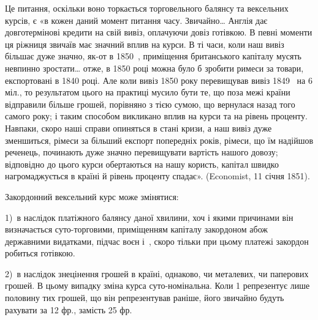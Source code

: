 Це питання, оскільки воно торкається торговельного балянсу та вексельних
курсів, є «в кожен даний момент питання часу. Звичайно\dots{} Англія дає
довготермінові кредити на свій вивіз, оплачуючи довіз готівкою. В певні моменти
ця ріжниця звичаїв має значний вплив на курси. В ті часи, коли наш
вивіз більшає дуже значно, як-от в 1850~, приміщення британського капіталу
мусять невпинно зростати\dots{} отже, в 1850 році можна було б зробити римеси
за товари, експортовані в 1840 році. Але коли вивіз 1850 року перевищував
вивіз 1849~ на 6 міл., то результатом цього на практиці мусило бути те, що
поза межі країни відправили більше грошей, порівняно з тією сумою, що вернулася
назад того самого року; і таким способом викликано вплив на курси
та на рівень проценту. Навпаки, скоро наші справи опиняться в стані кризи,
а наш вивіз дуже зменшиться, рімеси за більший експорт попередніх років, рімеси,
що їм надійшов реченець, починають дуже значно перевищувати вартість нашого
довозу; відповідно до цього курси обертаються на нашу користь, капітал швидко
нагромаджується в країні й рівень проценту спадає». (Economist, 11 січня 1851).

Закордонний вексельний курс може змінятися:

1)~в наслідок платіжного балянсу даної хвилини, хоч і якими причинами він
визначається суто-торговими, приміщенням капіталу закордоном абож державними
видатками, підчас воєн і~, скоро тільки при цьому платежі закордон
робиться готівкою.

2)~в наслідок знецінення грошей в країні, однаково, чи металевих, чи
паперових грошей. В цьому випадку зміна курса суто-номінальна. Коли 1
репрезентує лише половину тих грошей, що він репрезентував раніше, його
звичайно будуть рахувати за 12 фр., замість 25 фр.
